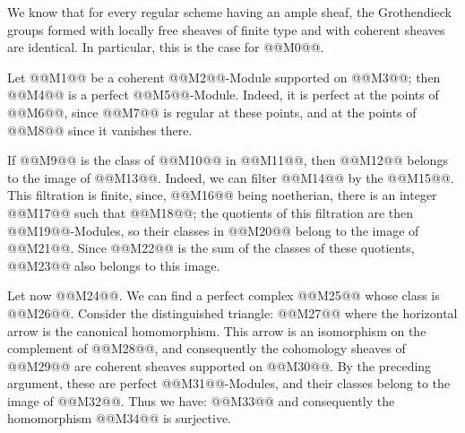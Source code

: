 We know that for every regular scheme having an ample sheaf, the Grothendieck groups formed with locally free sheaves of finite type and with coherent sheaves are identical. In particular, this is the case for @@M0@@.

Let @@M1@@ be a coherent @@M2@@-Module supported on @@M3@@; then @@M4@@ is a perfect @@M5@@-Module. Indeed, it is perfect at the points of @@M6@@, since @@M7@@ is regular at these points, and at the points of @@M8@@ since it vanishes there.

If @@M9@@ is the class of @@M10@@ in @@M11@@, then @@M12@@ belongs to the image of @@M13@@. Indeed, we can filter @@M14@@ by the @@M15@@. This filtration is finite, since, @@M16@@ being noetherian, there is an integer @@M17@@ such that @@M18@@; the quotients of this filtration are then @@M19@@-Modules, so their classes in @@M20@@ belong to the image of @@M21@@. Since @@M22@@ is the sum of the classes of these quotients, @@M23@@ also belongs to this image.

Let now @@M24@@. We can find a perfect complex @@M25@@ whose class is @@M26@@. Consider the distinguished triangle:
@@M27@@
where the horizontal arrow is the canonical homomorphism. This arrow is an isomorphism on the complement of @@M28@@, and consequently the cohomology sheaves of @@M29@@ are coherent sheaves supported on @@M30@@. By the preceding argument, these are perfect @@M31@@-Modules, and their classes belong to the image of @@M32@@. Thus we have:
@@M33@@
and consequently the homomorphism @@M34@@ is surjective.



\providecommand{\Q}{\mathbb Q}
\providecommand{\bfP}{\mathbf P}
\providecommand{\gr}{\operatorname{gr}}
\providecommand{\Id}{\operatorname{Id}}
\providecommand{\Fil}{\operatorname{Fil}}
\providecommand{\Imf}{\operatorname{Im}}
\providecommand{\rank}{\operatorname{rank}}
\providecommand{\codim}{\operatorname{codim}}
\providecommand{\cJ}{\mathcal J}
\providecommand{\cI}{\mathcal I}
\providecommand{\cN}{\mathcal N}
\providecommand{\cE}{\mathcal E}
\providecommand{\cO}{\mathcal O}


